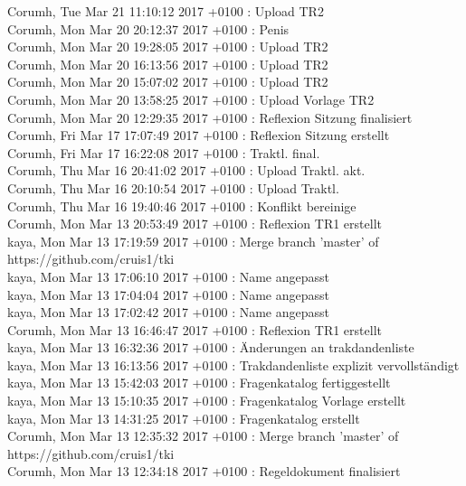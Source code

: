Corumh, Tue Mar 21 11:10:12 2017 +0100 : Upload TR2\\
Corumh, Mon Mar 20 20:12:37 2017 +0100 : Penis\\
Corumh, Mon Mar 20 19:28:05 2017 +0100 : Upload TR2\\
Corumh, Mon Mar 20 16:13:56 2017 +0100 : Upload TR2\\
Corumh, Mon Mar 20 15:07:02 2017 +0100 : Upload TR2\\
Corumh, Mon Mar 20 13:58:25 2017 +0100 : Upload Vorlage TR2\\
Corumh, Mon Mar 20 12:29:35 2017 +0100 : Reflexion Sitzung finalisiert\\
Corumh, Fri Mar 17 17:07:49 2017 +0100 : Reflexion Sitzung erstellt\\
Corumh, Fri Mar 17 16:22:08 2017 +0100 : Traktl. final.\\
Corumh, Thu Mar 16 20:41:02 2017 +0100 : Upload Traktl. akt.\\
Corumh, Thu Mar 16 20:10:54 2017 +0100 : Upload Traktl.\\
Corumh, Thu Mar 16 19:40:46 2017 +0100 : Konflikt bereinige\\
Corumh, Mon Mar 13 20:53:49 2017 +0100 : Reflexion TR1 erstellt\\
kaya, Mon Mar 13 17:19:59 2017 +0100 : Merge branch 'master' of https://github.com/cruis1/tki\\
kaya, Mon Mar 13 17:06:10 2017 +0100 : Name angepasst\\
kaya, Mon Mar 13 17:04:04 2017 +0100 : Name angepasst\\
kaya, Mon Mar 13 17:02:42 2017 +0100 : Name angepasst\\
Corumh, Mon Mar 13 16:46:47 2017 +0100 : Reflexion TR1 erstellt\\
kaya, Mon Mar 13 16:32:36 2017 +0100 : Änderungen an trakdandenliste\\
kaya, Mon Mar 13 16:13:56 2017 +0100 : Trakdandenliste explizit vervollständigt\\
kaya, Mon Mar 13 15:42:03 2017 +0100 : Fragenkatalog fertiggestellt\\
kaya, Mon Mar 13 15:10:35 2017 +0100 : Fragenkatalog Vorlage erstellt\\
kaya, Mon Mar 13 14:31:25 2017 +0100 : Fragenkatalog erstellt\\
Corumh, Mon Mar 13 12:35:32 2017 +0100 : Merge branch 'master' of https://github.com/cruis1/tki\\
Corumh, Mon Mar 13 12:34:18 2017 +0100 : Regeldokument finalisiert\\
